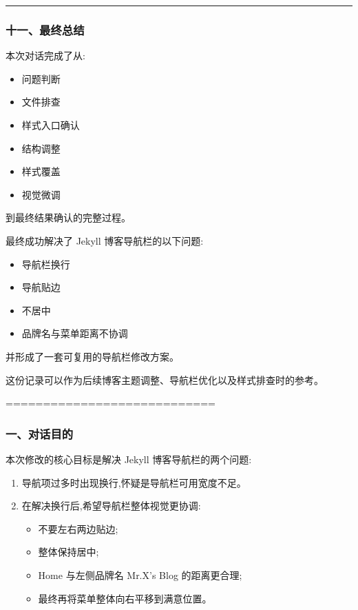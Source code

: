 \documentclass[lang=cn,scheme=chinese,color=blue,device=normal,toc=onecol,math=cm]{elegantbook}
\begin{document}
\medskip\hrule\medskip


\subsubsection{十一、最终总结}


本次对话完成了从:\par


\begin{itemize}
\item 问题判断
\item 文件排查
\item 样式入口确认
\item 结构调整
\item 样式覆盖
\item 视觉微调
\end{itemize}


到最终结果确认的完整过程。\par


最终成功解决了 Jekyll 博客导航栏的以下问题:\par


\begin{itemize}
\item 导航栏换行
\item 导航贴边
\item 不居中
\item 品牌名与菜单距离不协调
\end{itemize}


并形成了一套可复用的导航栏修改方案。\par


这份记录可以作为后续博客主题调整、导航栏优化以及样式排查时的参考。\par


============================\par


\subsubsection{一、对话目的}


本次修改的核心目标是解决 Jekyll 博客导航栏的两个问题:\par


\begin{enumerate}
\item 导航项过多时出现换行,怀疑是导航栏可用宽度不足。
\item 在解决换行后,希望导航栏整体视觉更协调: 
\begin{itemize}
\item 不要左右两边贴边;
\item 整体保持居中;
\item Home 与左侧品牌名 Mr.X’s Blog 的距离更合理;
\item 最终再将菜单整体向右平移到满意位置。
\end{itemize}
\end{enumerate}
\end{document}
